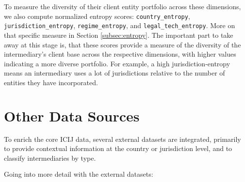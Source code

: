 To measure the diversity of their client entity portfolio across these dimensions, we also compute normalized entropy scores: \texttt{country\_entropy}, \texttt{jurisdiction\_entropy}, \texttt{regime\_entropy}, and \texttt{legal\_tech\_entropy}. More on that specific measure in Section \ref{subsec:entropy}. The important part to take away at this stage is, that these scores provide a measure of the diversity of the intermediary's client base across the respective dimensions, with higher values indicating a more diverse portfolio. For example, a high jurisdiction-entropy means an intermediary uses a lot of jurisdictions relative to the number of entities they have incorporated.

\section{Other Data Sources}
\label{sec:3_2}
To enrich the core ICIJ data, several external datasets are integrated, primarily to provide contextual information at the country or jurisdiction level, and to classify intermediaries by type.

Going into more detail with the external datasets:

